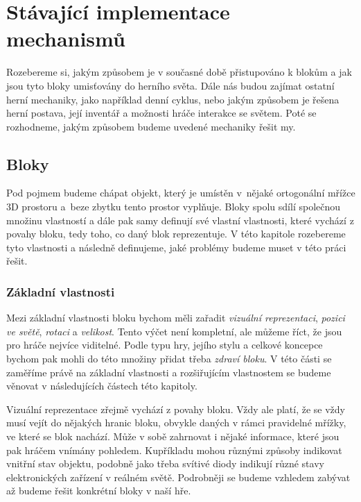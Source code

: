 

\section{Stávající implementace mechanismů}

Rozebereme si, jakým způsobem je v současné době přistupováno k blokům a jak jsou tyto bloky umisťovány do herního světa. Dále nás budou zajímat ostatní herní mechaniky, jako například denní cyklus, nebo jakým způsobem je řešena herní postava, její inventář a možnosti hráče interakce se světem. Poté se rozhodneme, jakým způsobem budeme uvedené mechaniky řešit my.

\subsection{Bloky}

Pod pojmem  budeme chápat objekt, který je umístěn v~nějaké ortogonální mřížce 3D prostoru a~beze zbytku tento prostor vyplňuje. Bloky spolu sdílí společnou množinu vlastností a dále pak samy definují své vlastní vlastnosti, které vychází z povahy bloku, tedy toho, co daný blok reprezentuje. V této kapitole rozebereme tyto vlastnosti a následně definujeme, jaké problémy budeme muset v této práci řešit.


\subsubsection{Základní vlastnosti}

Mezi základní vlastnosti bloku bychom měli zařadit \textit{vizuální reprezentaci}, \textit{pozici ve světě}, \textit{rotaci} a \textit{velikost}. Tento výčet není kompletní, ale můžeme říct, že jsou pro hráče nejvíce viditelné. Podle typu hry, jejího stylu a celkové koncepce bychom pak mohli do této množiny přidat třeba \textit{zdraví bloku}. V této části se zaměříme právě na základní vlastnosti a rozšiřujícím vlastnostem se budeme věnovat v následujících částech této kapitoly.

Vizuální reprezentace zřejmě vychází z povahy bloku. Vždy ale platí, že se vždy musí vejít do nějakých hranic bloku, obvykle daných v rámci pravidelné mřížky, ve které se blok nachází. Může v sobě zahrnovat i nějaké informace, které jsou pak hráčem vnímány pohledem. Kupříkladu mohou různými způsoby indikovat vnitřní stav objektu, podobně jako třeba svítivé diody indikují různé stavy elektronických zařízení v reálném světě. Podrobněji se budeme vzhledem zabývat až budeme řešit konkrétní bloky v naší hře.

